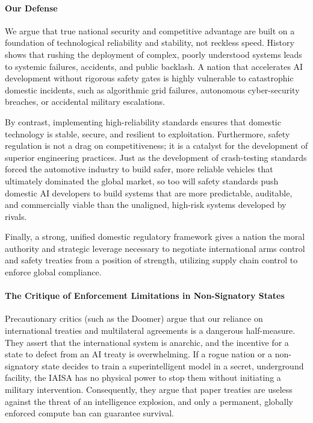 \paragraph{Our Defense}\label{our-defense-1}

We argue that true national security and competitive advantage are built
on a foundation of technological reliability and stability, not reckless
speed. History shows that rushing the deployment of complex, poorly
understood systems leads to systemic failures, accidents, and public
backlash. A nation that accelerates AI development without rigorous
safety gates is highly vulnerable to catastrophic domestic incidents,
such as algorithmic grid failures, autonomous cyber-security breaches,
or accidental military escalations.

By contrast, implementing high-reliability standards ensures that
domestic technology is stable, secure, and resilient to exploitation.
Furthermore, safety regulation is not a drag on competitiveness; it is a
catalyst for the development of superior engineering practices. Just as
the development of crash-testing standards forced the automotive
industry to build safer, more reliable vehicles that ultimately
dominated the global market, so too will safety standards push domestic
AI developers to build systems that are more predictable, auditable, and
commercially viable than the unaligned, high-risk systems developed by
rivals.

Finally, a strong, unified domestic regulatory framework gives a nation
the moral authority and strategic leverage necessary to negotiate
international arms control and safety treaties from a position of
strength, utilizing supply chain control to enforce global compliance.

\paragraph{The Critique of Enforcement Limitations in Non-Signatory
States}\label{the-critique-of-enforcement-limitations-in-non-signatory-states}

Precautionary critics (such as the Doomer) argue that our reliance on
international treaties and multilateral agreements is a dangerous
half-measure. They assert that the international system is anarchic, and
the incentive for a state to defect from an AI treaty is overwhelming.
If a rogue nation or a non-signatory state decides to train a
superintelligent model in a secret, underground facility, the IAISA has
no physical power to stop them without initiating a military
intervention. Consequently, they argue that paper treaties are useless
against the threat of an intelligence explosion, and only a permanent,
globally enforced compute ban can guarantee survival.

